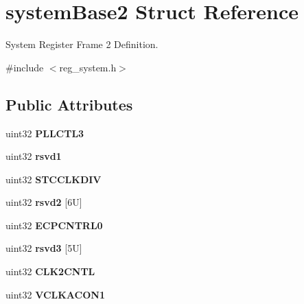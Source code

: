 \hypertarget{structsystemBase2}{}\section{system\+Base2 Struct Reference}
\label{structsystemBase2}


System Register Frame 2 Definition.  




{\ttfamily \#include $<$reg\+\_\+system.\+h$>$}

\subsection*{Public Attributes}
\begin{DoxyCompactItemize}
\item 
\mbox{\label{structsystemBase2_a879e890c059afe7f32cbc04c2e03d433}} 
uint32 {\bfseries P\+L\+L\+C\+T\+L3}
\item 
\mbox{\label{structsystemBase2_a0a0e68d91b93d3857e977ad1a68c1bcc}} 
uint32 {\bfseries rsvd1}
\item 
\mbox{\label{structsystemBase2_a0acb117b1398bcaf721593e786f77f61}} 
uint32 {\bfseries S\+T\+C\+C\+L\+K\+D\+IV}
\item 
\mbox{\label{structsystemBase2_a2d41e1c1432eb01c892a9e52b2857485}} 
uint32 {\bfseries rsvd2} \mbox{[}6\+U\mbox{]}
\item 
\mbox{\label{structsystemBase2_ab9f6b409cb7262a66b5b3aa85be11a89}} 
uint32 {\bfseries E\+C\+P\+C\+N\+T\+R\+L0}
\item 
\mbox{\label{structsystemBase2_ae575c552bb8f38c8aa551716f350dff1}} 
uint32 {\bfseries rsvd3} \mbox{[}5\+U\mbox{]}
\item 
\mbox{\label{structsystemBase2_aa4924ec3e4536e3d1e1d8e92e6b2a990}} 
uint32 {\bfseries C\+L\+K2\+C\+N\+TL}
\item 
\mbox{\label{structsystemBase2_ac29657a002653e2c137c916bfcef7979}} 
uint32 {\bfseries V\+C\+L\+K\+A\+C\+O\+N1}
\item 

\end{DoxyCompactItemize}
